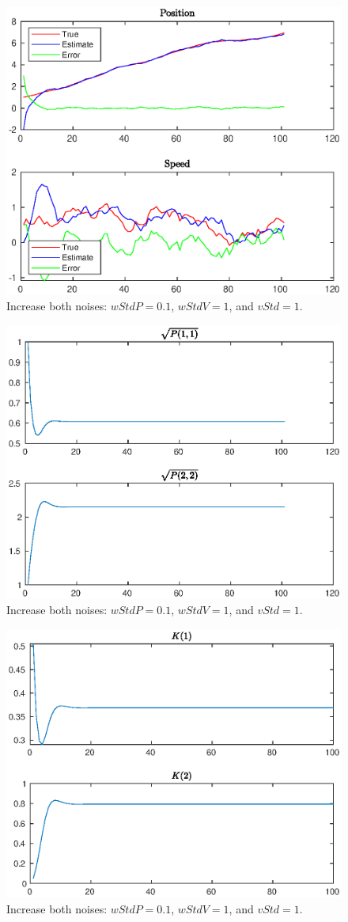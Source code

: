 \documentclass[11pt,a4paper]{article}
\begin{document}
\begin{itemize}
		\begin{figure}[H]
			\centering
			\includegraphics[width=0.57\columnwidth]{Warmup_Figure_1_wP_0_1_wV_1_vP_1.eps}
			\caption{Increase both noises: $wStdP = 0.1$, $wStdV = 1$, and $vStd = 1$.}
			\label{fig:Warmup_Figure_1_wP_0_1_wV_1_vP_1}
		\end{figure}
			
		\begin{figure}[H]
			\centering
			\includegraphics[width=0.57\columnwidth]{Warmup_Figure_2_wP_0_1_wV_1_vP_1.eps}
			\caption{Increase both noises: $wStdP = 0.1$, $wStdV = 1$, and $vStd = 1$.}
			\label{fig:Warmup_Figure_2_wP_0_1_wV_1_vP_1}
		\end{figure}
		
		\begin{figure}[H]
			\centering
			\includegraphics[width=0.57\columnwidth]{Warmup_Figure_3_wP_0_1_wV_1_vP_1.eps}
			\caption{Increase both noises: $wStdP = 0.1$, $wStdV = 1$, and $vStd = 1$.}
			\label{fig:Warmup_Figure_3_wP_0_1_wV_1_vP_1}
		\end{figure}


\end{itemize}
\end{document}
